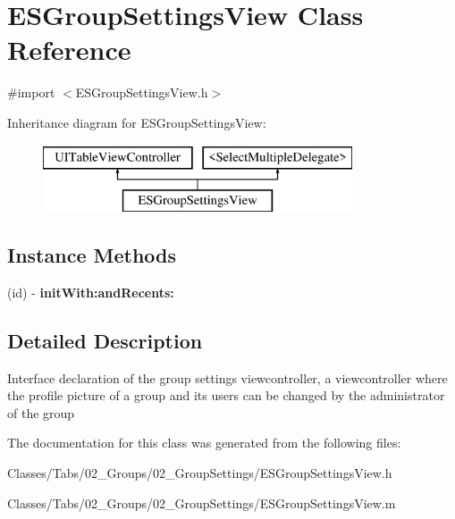 \hypertarget{interface_e_s_group_settings_view}{}\section{E\+S\+Group\+Settings\+View Class Reference}
\label{interface_e_s_group_settings_view}


{\ttfamily \#import $<$E\+S\+Group\+Settings\+View.\+h$>$}

Inheritance diagram for E\+S\+Group\+Settings\+View\+:\begin{figure}[H]
\begin{center}
\leavevmode
\includegraphics[height=2.000000cm]{interface_e_s_group_settings_view}
\end{center}
\end{figure}
\subsection*{Instance Methods}
\begin{DoxyCompactItemize}
\item 
\hypertarget{interface_e_s_group_settings_view_a72011c81b102995d31466f7affe345e9}{}(id) -\/ {\bfseries init\+With\+:and\+Recents\+:}\label{interface_e_s_group_settings_view_a72011c81b102995d31466f7affe345e9}

\end{DoxyCompactItemize}


\subsection{Detailed Description}
Interface declaration of the group settings viewcontroller, a viewcontroller where the profile picture of a group and its users can be changed by the administrator of the group 

The documentation for this class was generated from the following files\+:\begin{DoxyCompactItemize}
\item 
Classes/\+Tabs/02\+\_\+\+Groups/02\+\_\+\+Group\+Settings/E\+S\+Group\+Settings\+View.\+h\item 
Classes/\+Tabs/02\+\_\+\+Groups/02\+\_\+\+Group\+Settings/E\+S\+Group\+Settings\+View.\+m\end{DoxyCompactItemize}
